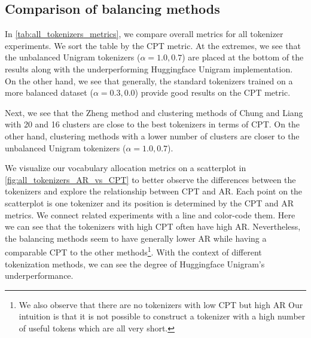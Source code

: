 \subsection{Comparison of balancing methods}
\label{sec:comparison_balancing_methods}



In \autoref{tab:all_tokenizers_metrics}, we compare overall metrics for all tokenizer experiments. We sort the table by the CPT metric. At the extremes, we see that the unbalanced Unigram tokenizers ($\alpha=1.0, 0.7$) are placed at the bottom of the results along with the underperforming Huggingface Unigram implementation. On the other hand, we see that generally, the standard tokenizers trained on a more balanced dataset ($\alpha=0.3, 0.0$) provide good results on the CPT metric. 

Next, we see that the Zheng method and clustering methods of Chung and Liang with 20 and 16 clusters are close to the best tokenizers in terms of CPT. On the other hand, clustering methods with a lower number of clusters are closer to the unbalanced Unigram tokenizers ($\alpha=1.0, 0.7$).

We visualize our vocabulary allocation metrics on a scatterplot in \autoref{fig:all_tokenizers_AR_vs_CPT} to better observe the differences between the tokenizers and explore the relationship between CPT and AR. Each point on the scatterplot is one tokenizer and its position is determined by the CPT and AR metrics. We connect related experiments with a line and color-code them. Here we can see that the tokenizers with high CPT often have high AR. Nevertheless, the balancing methods seem to have generally lower AR while having a comparable CPT to the other methods\footnote{We also observe that there are no tokenizers with low CPT but high AR Our intuition is that it is not possible to construct a tokenizer with a high number of useful tokens which are all very short.}. With the context of different tokenization methods, we can see the degree of Huggingface Unigram's underperformance.

